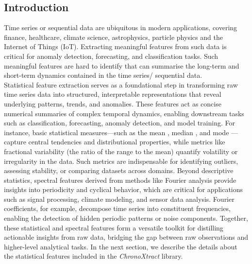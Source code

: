 \begin{multicols}{2}
\tableofcontents
\section{Introduction}
Time series or sequential data are ubiquitous in modern applications, covering finance, healthcare, climate science, astrophysics, particle physics and the Internet of Things (IoT). Extracting meaningful features from such data is critical for anomaly detection, forecasting, and classification tasks. Such meaningful features are hard to identify that can summarise the long-term and short-term dynamics contained in the time series/ sequential data. \\
Statistical feature extraction serves as a foundational step in transforming raw time series data into structured, interpretable representations that reveal underlying patterns, trends, and anomalies. These features act as concise numerical summaries of complex temporal dynamics, enabling downstream tasks such as classification, forecasting, anomaly detection, and model training. For instance, basic statistical measures—such as the mean , median , and mode —capture central tendencies and distributional properties, while metrics like fractional variability (the ratio of the range to the mean) quantify volatility or irregularity in the data. Such metrics are indispensable for identifying outliers, assessing stability, or comparing datasets across domains. Beyond descriptive statistics, spectral features derived from methods like Fourier analysis provide insights into periodicity and cyclical behavior, which are critical for applications such as signal processing, climate modeling, and sensor data analysis. Fourier coefficients, for example, decompose time series into constituent frequencies, enabling the detection of hidden periodic patterns or noise components. Together, these statistical and spectral features form a versatile toolkit for distilling actionable insights from raw data, bridging the gap between raw observations and higher-level analytical tasks. In the next section, we describe the details about the statistical features included in the \textit{ChronoXtract} library. 
\end{multicols}